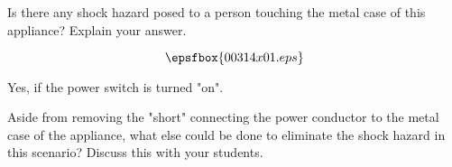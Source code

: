 

Is there any shock hazard posed to a person touching the metal case of this appliance?  Explain your answer.

$$\epsfbox{00314x01.eps}$$







Yes, if the power switch is turned "on".







Aside from removing the "short" connecting the power conductor to the metal case of the appliance, what else could be done to eliminate the shock hazard in this scenario?  Discuss this with your students.




